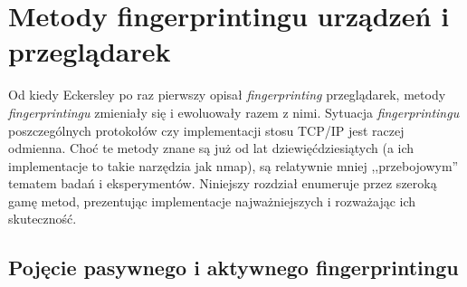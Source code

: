 \chapter{Metody fingerprintingu urządzeń i przeglądarek}
Od kiedy Eckersley \cite{eckersley2010unique} po raz pierwszy opisał
\emph{fingerprinting} przeglądarek, metody \emph{fingerprintingu} zmieniały się
i ewoluowały razem z nimi. Sytuacja \emph{fingerprintingu} poszczególnych
protokołów czy implementacji stosu TCP/IP jest raczej odmienna. Choć te metody
znane są już od lat dziewięćdziesiątych (a ich implementacje to takie narzędzia
jak nmap), są relatywnie mniej ,,przebojowym'' tematem badań i eksperymentów.
Niniejszy rozdział enumeruje przez szeroką gamę metod, prezentując implementacje
najważniejszych i rozważając ich skuteczność.

\section{Pojęcie pasywnego i aktywnego fingerprintingu}








